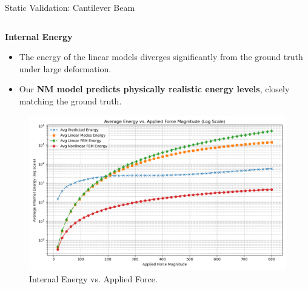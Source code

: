 \documentclass{beamer}
\begin{document}
\begin{frame}{Static Validation: Cantilever Beam}
\begin{columns}[T]
        \begin{column}{0.5\textwidth}
            \textbf{Internal Energy}
            \begin{itemize}
                \item The energy of the linear models diverges significantly from the ground truth under large deformation.
                \item Our \textbf{NM model predicts physically realistic energy levels}, closely matching the ground truth.
            \end{itemize}
            \begin{figure}
                \includegraphics[width=\textwidth]{Images/beam_static_energy.png}
                \caption{Internal Energy vs. Applied Force.}
            \end{figure}
        \end{column}
    \end{columns}
\end{frame}
\end{document}

